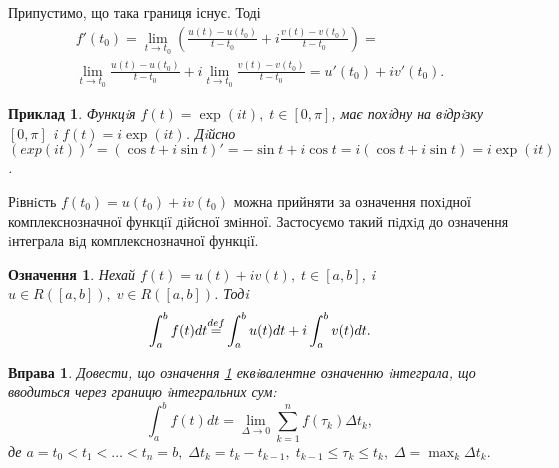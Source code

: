 \documentclass[10pt]{report} %
\let\oldlim\lim
\renewcommand{\lim}{\displaystyle\oldlim}
\newtheorem{definition}{Означення}[section]
\newtheorem{example}{\indent Приклад}[section]
\newtheorem{exercise}{Вправа}
\begin{document}
Припустимо, що така границя існує. Тоді
\begin{multline*}
f'(t_0)=\lim_{t\to t_0}\left(\frac{u(t)-u(t_0)}{t-t_0}+i\frac{v(t)-v(t_0)}{t-t_0}\right)=\\
\lim_{t\to t_0}\frac{u(t)-u(t_0)}{t-t_0} +i\lim_{t\to t_0}\frac{v(t)-v(t_0)}{t-t_0}=u'(t_0)+iv'(t_0).
\end{multline*}
\begin{example}
Функцiя $f(t) = \exp(it),\;t\in [0, \pi]$, має похiдну на вiдрiзку $[0, \pi]$ i $f (t) =
i \exp(it)$. Дiйсно $(exp(it))' = (\cos t + i \sin t)' = - \sin t + i \cos t = i(\cos t + i \sin t) = i \exp(it)$.
\end{example}
Рiвнiсть $f (t_0 ) = u (t_0 ) + iv (t_0 )$ можна прийняти за означення похiдної комплекснозначної функцiї дiйсної змiнної.
 Застосуємо такий пiдхiд до означення iнтеграла вiд комплекснозначної функцiї.
\begin{definition}\label{ComplexIntegralDef}
Нехай $f (t) = u(t) + iv(t),\;t \in[a, b]$, i $u \in R([a, b]),\;v\in R([a, b])$. Тодi
\[\int_{a}^bf(t)dt{\buildrel{d{}ef}\over=}\int_a^b u(t)dt+i\int_a^b v(t)dt.\]
\end{definition}
\begin{exercise}
Довести, що означення \ref{ComplexIntegralDef} еквiвалентне означенню iнтеграла, що вводиться через границю iнтегральних сум:
\[\int_a^bf(t)dt=\lim_{\Delta\to 0}\sum_{k=1}^n f(\tau_k)\Delta t_k,\]
де $a=t_0<t_1<\ldots<t_n=b,\;\Delta t_k=t_k-t_{k-1},\;t_{k-1}\leq\tau_k\leq t_k,\;\Delta=\max_k \Delta t_k.$
\end{exercise}
\end{document}
